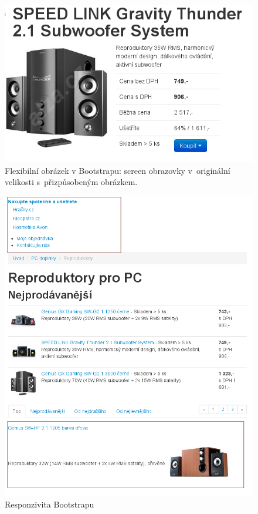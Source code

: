 \documentclass[thesis=B,czech]{FITthesis}[2012/06/26]
\begin{document}
\begin{figure}[h]
	\begin{center}
	\includegraphics[scale=1]{images/image15.png}
	\end{center}
	\caption[Flexibilní obrázek v Bootstrapu]{Flexibilní obrázek v Bootstrapu: screen obrazovky v~originální velikosti s~přizpůsobeným obrázkem.}
	\label{imgB2}
\end{figure}

\begin{figure}[p]
	\begin{center}
	\includegraphics[scale=0.7]{images/image11.png}
	\end{center}
	\caption{Responzivita Bootstrapu}
	\label{imgB3}
\end{figure}
\end{document}

